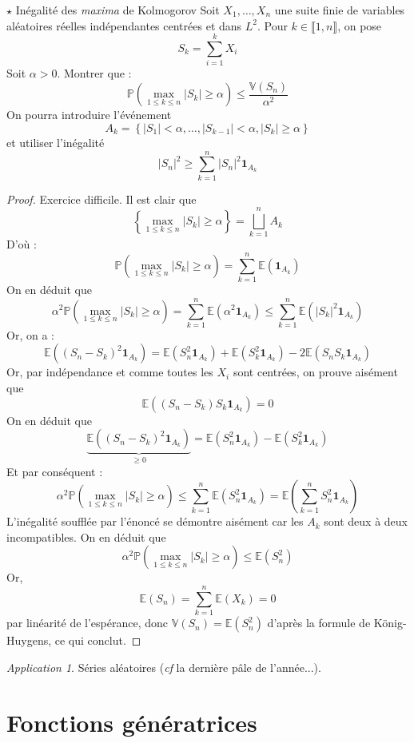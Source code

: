 \documentclass[french,a4paper]{article}
\renewcommand{\P}{\mathbb{P}}
\newcommand{\E}{\mathbb{E}}
\newcommand{\V}{\mathbb{V}}
\theoremstyle{plain}
\theoremstyle{definition}
\theoremstyle{remark}
\newtheorem*{app}{Application}
\begin{document}
\begin{ex}[Moulin.68]{$\star$ Inégalité des \textit{maxima} de Kolmogorov}
	Soit $X_1,\ldots,X_n$ une suite finie de variables aléatoires réelles indépendantes centrées et dans $L^2$. Pour $k\in\llbracket1,n\rrbracket$, on pose $$S_k=\sum_{i=1}^{k}X_i$$ Soit $\alpha>0$. Montrer que : $$\P\left(\underset{1\leqslant k\leqslant n}{\max}\lvert S_k\rvert\geqslant\alpha\right)\leqslant\frac{\V(S_n)}{\alpha^2}$$ On pourra introduire l'événement $$A_k=\left\{\lvert S_1\rvert <\alpha,\ldots,\lvert S_{k-1}\rvert<\alpha,\lvert S_k\rvert\geqslant\alpha\right\}$$ et utiliser l'inégalité $$\lvert S_n\rvert^2\geqslant\sum_{k=1}^{n}\lvert S_n\rvert^2\mathbf{1}_{A_k}$$
\end{ex}
\begin{proof}
	Exercice difficile. Il est clair que $$\left\{\underset{1\leqslant k\leqslant n}{\max}\lvert S_k\rvert\geqslant\alpha\right\}=\bigsqcup_{k=1}^nA_k$$ D'où : $$\P\left(\underset{1\leqslant k\leqslant n}{\max}\lvert S_k\rvert\geqslant\alpha\right)=\sum_{k=1}^{n}\E(\mathbf{1}_{A_k})$$ On en déduit que $$\alpha^2\P\left(\underset{1\leqslant k\leqslant n}{\max}\lvert S_k\rvert\geqslant\alpha\right)=\sum_{k=1}^{n}\E(\alpha^2\mathbf{1}_{A_k})\leqslant\sum_{k=1}^{n}\E(\lvert S_k\rvert^2\mathbf{1}_{A_k})$$ Or, on a : $$\E((S_n-S_k)^2\mathbf{1}_{A_k})=\E(S_n^2\mathbf{1}_{A_k})+\E(S_k^2\mathbf{1}_{A_k})-2\E(S_nS_k\mathbf{1}_{A_k})$$ Or, par indépendance et comme toutes les $X_i$ sont centrées, on prouve aisément que $$\E((S_n-S_k)S_k\mathbf{1}_{A_k})=0$$ On en déduit que $$\underbrace{\E((S_n-S_k)^2\mathbf{1}_{A_k})}_{\geqslant0}=\E(S_n^2\mathbf{1}_{A_k})-\E(S_k^2\mathbf{1}_{A_k})$$ Et par conséquent : $$\alpha^2\P\left(\underset{1\leqslant k\leqslant n}{\max}\lvert S_k\rvert\geqslant\alpha\right)\leqslant\sum_{k=1}^{n}\E(S_n^2\mathbf{1}_{A_k})=\E\left(\sum_{k=1}^{n}S_n^2\mathbf{1}_{A_k}\right)$$ L'inégalité soufflée par l'énoncé se démontre aisément car les $A_k$ sont deux à deux incompatibles. On en déduit que $$\alpha^2\P\left(\underset{1\leqslant k\leqslant n}{\max}\lvert S_k\rvert\geqslant\alpha\right)\leqslant\E(S_n^2)$$ Or, $$\E(S_n)=\sum_{k=1}^{n}\E(X_k)=0$$ par linéarité de l'espérance, donc $\V(S_n)=\E(S_n^2)$ d'après la formule de König-Huygens, ce qui conclut.
\end{proof}
\begin{app}
	Séries aléatoires (\textit{cf} la dernière pâle de l'année...).
\end{app}

\section{Fonctions génératrices}
\end{document}
